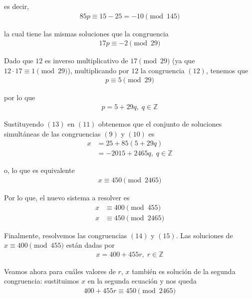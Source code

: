 \documentclass[letterpaper,10pt]{article}
\begin{document}
\begin{enumerate}
\begin{itemize}
        es decir,
        \begin{align*}
            85p \equiv 15 - 25 = -10 \pmod{145}
        \end{align*}
        
        la cual tiene las mismas soluciones que la congruencia 
        \begin{align}
            17p \equiv -2 \pmod{29}
        \end{align}
        
        Dado que $12$ es inverso multiplicativo de $17 \pmod{29}$ (ya que 
        $12 \cdot 17 \equiv 1 \pmod{29}$), multiplicando por $12$ la congruencia
        $(12)$, tenemos que 
        \begin{align*}
            p \equiv 5 \pmod{29} 
        \end{align*}
        
        por lo que 
        \begin{align}
            p = 5 + 29q, \; q \in \mathbb{Z}
        \end{align}
        
        Sustituyendo $(13)$ en $(11)$ obtenemos que el conjunto de soluciones
        simultáneas de las congruencias $(9)$ y $(10)$ es
        \begin{align*}
            x 
            &= 25 + 85(5 + 29q) \\
            &= -2015 + 2465q, \; q \in \mathbb{Z}
        \end{align*}
        
        o, lo que es equivalente
        \begin{align*}
            x \equiv 450 \pmod{2465}
        \end{align*}
        
        Por lo que, el nuevo sistema a resolver es
        \begin{align}
            x &\equiv 400 \pmod{455} \\
            x &\equiv 450 \pmod{2465}
        \end{align}
        
        Finalmente, resolvemos las congruencias $(14)$ y $(15)$. Las soluciones 
        de $x \equiv 400 \pmod{455}$ están dadas por
        \begin{align}
            x = 400 + 455r, \; r \in \mathbb{Z}
        \end{align}
        
        Veamos ahora para cuáles valores de $r$, $x$ también es solución de la
        segunda congruencia: sustituimos $x$ en la segunda ecuación y nos
        queda
        \begin{align*}
            400 + 455r \equiv 450 \pmod{2465}
        \end{align*}
        

\end{itemize}
\end{enumerate}
\end{document}
